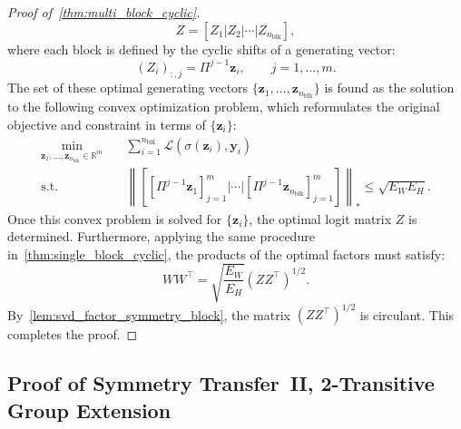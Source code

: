 \documentclass[11pt]{article}
\begin{document}
\begin{proof}[Proof of~\cref{thm:multi_block_cyclic}]
\[ Z = [Z_1 | Z_2 | \cdots | Z_{n_{\mathrm{blk}}}], \]
where each block is defined by the cyclic shifts of a generating vector:
\[ (Z_i)_{:,j}=\Pi^{j-1}\boldsymbol z_i,\qquad j=1,\ldots,m. \]
The set of these optimal generating vectors \(\{\boldsymbol{z}_{1}, \ldots, \boldsymbol{z}_{n_{\mathrm{blk}}}\}\) is found as the solution to the following convex optimization problem, which reformulates the original objective and constraint in terms of \(\{\boldsymbol{z}_{i}\}\):
\[
\begin{aligned}
\min_{\boldsymbol{z}_{1}, \ldots, \boldsymbol{z}_{n_{\mathrm{blk}}} \in \mathbb{R}^m} \quad & \sum_{i=1}^{n_{\mathrm{blk}}} \mathcal L \left(\sigma(\boldsymbol{z}_{i}), \boldsymbol{y}_i\right) \\
\text{s.t.} \quad & \left\| [ [\Pi^{j-1} \boldsymbol{z}_{1}]_{j=1}^{m} | \cdots | [\Pi^{j-1} \boldsymbol{z}_{n_{\mathrm{blk}}}]_{j=1}^{m} ] \right\|_* \le \sqrt{E_W E_H}.
\end{aligned}
\]
Once this convex problem is solved for \(\{\boldsymbol{z}_{i}\}\), the optimal logit matrix \(Z\) is determined. Furthermore, applying the same procedure in~\cref{thm:single_block_cyclic}, the products of the optimal factors must satisfy:
\[ WW^\top = \sqrt{\frac{E_W}{E_H}} (Z Z^\top)^{1/2}. \]
By~\cref{lem:svd_factor_symmetry_block}, the matrix \((Z Z^\top)^{1/2}\) is circulant.
This completes the proof.
\end{proof}

\subsection{Proof of Symmetry Transfer~II, 2-Transitive Group Extension}
\label{pf:2_transitive_optimal_embeddings}
\end{document}
